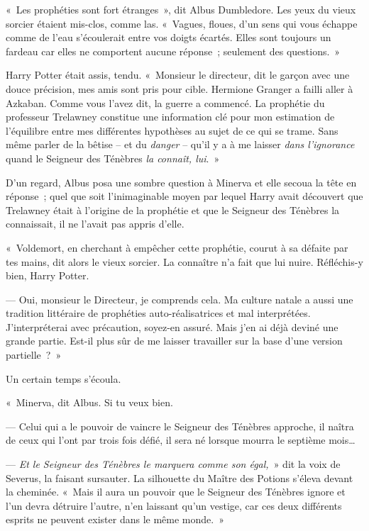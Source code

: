 «~Les prophéties sont fort étranges~», dit Albus Dumbledore.
Les yeux du vieux sorcier étaient mis-clos, comme las.
«~Vagues, floues, d'un sens qui vous échappe comme de l'eau s'écoulerait entre vos doigts écartés.
Elles sont toujours un fardeau car elles ne comportent aucune réponse~; seulement des questions.~»

Harry Potter était assis, tendu.
«~Monsieur le directeur, dit le garçon avec une douce précision, mes amis sont pris pour cible.
Hermione Granger a failli aller à Azkaban.
Comme vous l'avez dit, la guerre a commencé.
La prophétie du professeur Trelawney constitue une information clé pour mon estimation de l'équilibre entre mes différentes hypothèses au sujet de ce qui se trame.
Sans même parler de la bêtise -- et du \emph{danger} -- qu'il y a à me laisser \emph{dans l'ignorance} quand le Seigneur des Ténèbres \emph{la connaît, lui}.~»

D'un regard, Albus posa une sombre question à Minerva et elle secoua la tête en réponse~; quel que soit l'inimaginable moyen par lequel Harry avait découvert que Trelawney était à l'origine de la prophétie et que le Seigneur des Ténèbres la connaissait, il ne l'avait pas appris d'elle.

«~Voldemort, en cherchant à empêcher cette prophétie, courut à sa défaite par tes mains, dit alors le vieux sorcier.
La connaître n'a fait que lui nuire.
Réfléchis-y bien, Harry Potter.

--- Oui, monsieur le Directeur, je comprends cela.
Ma culture natale a aussi une tradition littéraire de prophéties auto-réalisatrices et mal interprétées.
J'interpréterai avec précaution, soyez-en assuré.
Mais j'en ai déjà deviné une grande partie.
Est-il plus sûr de me laisser travailler sur la base d'une version partielle~?~»

Un certain temps s'écoula.

«~Minerva, dit Albus.
Si tu veux bien.

--- Celui qui a le pouvoir de vaincre le Seigneur des Ténèbres approche, il naîtra de ceux qui l'ont par trois fois défié, il sera né lorsque mourra le septième mois…

--- \emph{Et le Seigneur des Ténèbres le marquera comme son égal,}~» dit la voix de Severus, la faisant sursauter.
La silhouette du Maître des Potions s'éleva devant la cheminée.
«~Mais il aura un pouvoir que le Seigneur des Ténèbres ignore et l'un devra détruire l'autre, n'en laissant qu'un vestige, car ces deux différents esprits ne peuvent exister dans le même monde.~»

